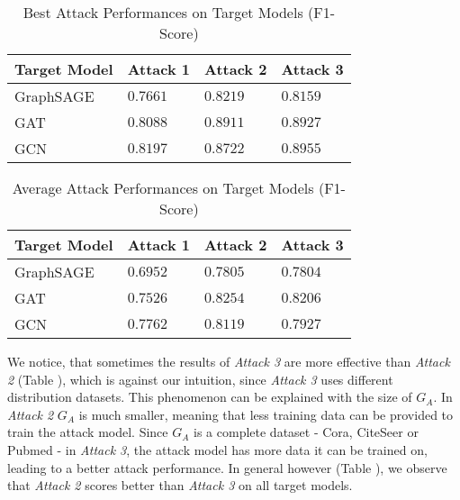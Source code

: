         \vspace{0.48cm}
        \begin{table}[!h]
            \centering
            \footnotesize
            \begin{tabular}{l|l|l|l|}
              \toprule
              Target Model & Attack 1 & Attack 2 & Attack 3 \\
              \midrule
              GraphSAGE & $0.7661$ & $0.8219$ & $0.8159$ \\
              GAT & $0.8088$ & $0.8911$ & $0.8927$ \\
              GCN & $0.8197$ & $0.8722$ & $0.8955$ \\
            
              \bottomrule
            \end{tabular}
            \caption{Best Attack Performances on Target Models (F1-Score)}
            \label{table:attack-best-results-all}
          \end{table}
        
        \vspace{0.48cm}
        \begin{table}[!h]
            \centering
            \footnotesize
            \begin{tabular}{l|l|l|l|}
            \toprule
            Target Model & Attack 1 & Attack 2 & Attack 3 \\
            \midrule
            GraphSAGE & $0.6952$ & $0.7805$ & $0.7804$ \\
            GAT & $0.7526$ & $0.8254$ & $0.8206$ \\
            GCN & $0.7762$ & $0.8119$ & $0.7927$ \\
              
            \bottomrule
            \end{tabular}
            \caption{Average Attack Performances on Target Models (F1-Score)}
            \label{table:attack-avg-results-all}
        \end{table}
    
    We notice, that sometimes the results of \emph{Attack 3} are more effective than \emph{Attack 2} (Table ), which is against our intuition, since \emph{Attack 3} uses different distribution datasets.
    This phenomenon can be explained with the size of $G_A$.
    In \emph{Attack 2} $G_A$ is much smaller, meaning that less training data can be provided to train the attack model.
    Since $G_A$ is a complete dataset - Cora, CiteSeer or Pubmed - in \emph{Attack 3}, the attack model has more data it can be trained on, leading to a better attack performance.
    In general however (Table ), we observe that \emph{Attack 2} scores better than \emph{Attack 3} on all target models.

